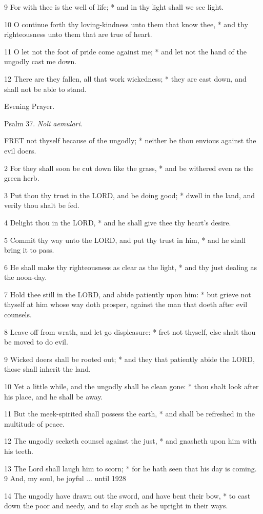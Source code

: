 9 For with thee is the well of life; * and in thy light
shall we see light.

10 O continue forth thy loving-kindness unto them that
know thee, * and thy righteousness unto them that are true of heart.

11 O let not the foot of pride come against me; * and
let not the hand of the ungodly cast me down.

12 There are they fallen, all that work wickedness;
* they are cast down, and shall not be able to stand.

Evening
Prayer.

Psalm
37. \emph{Noli aemulari.}

FRET
not thyself because of the ungodly; * neither be thou envious against
the evil doers.

2 For they shall soon be cut down like the grass, *
and be withered even as the green herb.

3 Put thou thy trust in the LORD,
and be doing good; * dwell in the land, and verily thou shalt be fed.

4 Delight thou in the LORD,
* and he shall give thee thy heart's desire.

5 Commit thy way unto the LORD,
and put thy trust in him, * and he shall bring it to pass.

6 He shall make thy righteousness as clear as the light,
* and thy just dealing as the noon-day.

7 Hold thee still in the LORD,
and abide patiently upon him: * but grieve not thyself at him whose way
doth prosper, against the man that doeth after evil counsels.

8 Leave off from wrath, and let go displeasure: * fret
not thyself, else shalt thou be moved to do evil.

9 Wicked doers shall be rooted out; * and they that
patiently abide the LORD, those shall inherit the
land.

10 Yet a little while, and the ungodly shall be clean
gone: * thou shalt look after his place, and he shall be away.

11 But the meek-spirited shall possess the earth, *
and shall be refreshed in the multitude of peace.

12 The ungodly seeketh counsel against the just, *
and gnasheth upon him with his teeth.

13 The Lord shall laugh him to scorn; * for he hath
seen that his day is coming. 9 And, my soul, be joyful
... until
1928

14 The ungodly have drawn out the sword, and have bent
their bow, * to cast down the poor and needy, and to slay such as be upright
in their ways.

